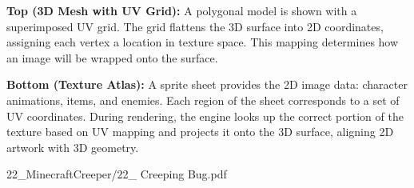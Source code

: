 \begin{SideNotePage}{
  \textbf{Top (3D Mesh with UV Grid):} A polygonal model is shown with a superimposed UV grid. The grid flattens the 3D surface into 2D coordinates, assigning each vertex a location in texture space. This mapping determines how an image will be wrapped onto the surface. \par
  \textbf{Bottom (Texture Atlas):} A sprite sheet provides the 2D image data: character animations, items, and enemies. Each region of the sheet corresponds to a set of UV coordinates. During rendering, the engine looks up the correct portion of the texture based on UV mapping and projects it onto the 3D surface, aligning 2D artwork with 3D geometry. \par

}{22_MinecraftCreeper/22_ Creeping Bug.pdf}
\end{SideNotePage}
